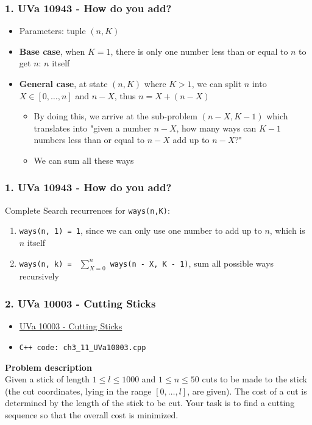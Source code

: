 \documentclass{beamer}
\begin{document}
\begin{frame}[fragile]
\frametitle{1. UVa 10943 - How do you add?}


\begin{itemize}
    \item Parameters: tuple $(n,K)$
    \item \textbf{Base case}, when $K=1$, there is only one number less than or equal to $n$ to get $n$: $n$ itself
    \item \textbf{General case}, at state $(n,K)$ where $K>1$, we can split $n$ into $X \in [0,\ldots,n]$ and $n-X$, thus $n = X + (n-X)$
    \begin{itemize}
        \item By doing this, we arrive at the sub-problem $(n-X, K-1)$ which translates into \color{blue}"given a number $n-X$, how many ways can $K-1$ numbers less than or equal to $n-X$ add up to $n-X$?"\color{black}
        \item We can sum all these ways
    \end{itemize}
\end{itemize}

\end{frame}

\begin{frame}[fragile]
\frametitle{1. UVa 10943 - How do you add?}

Complete Search recurrences for \verb|ways(n,K)|:
\begin{enumerate}
    \item \verb|ways(n, 1) = 1|, since we can only use one number to add up to $n$, which is $n$ itself
    \item \verb|ways(n, k) = | $\sum_{X=0}^{n}$ \verb|ways(n - X, K - 1)|, sum all possible ways recursively
\end{enumerate}

\end{frame}


\begin{frame}[fragile]
\frametitle{2. UVa 10003 - Cutting Sticks}

\begin{itemize}
    \item \href{https://onlinejudge.org/index.php?option=com_onlinejudge&Itemid=8&category=12&page=show_problem&problem=944}{UVa 10003 - Cutting Sticks}
    \item \color{red}\verb|C++ code: ch3_11_UVa10003.cpp|\color{black}
\end{itemize}

\vspace{0.3cm}

\color{red}\textbf{Problem description}\color{black} \\

Given a stick of length $1 \leq l \leq 1000$ and $1 \leq n \leq 50$ cuts to be made to the stick (the cut coordinates, lying in the range $[0,\ldots,l]$, are given). The cost of a cut is determined by the length of the stick to be cut. Your task is to find a cutting sequence so that the overall cost is minimized.


\end{frame}
\end{document}
